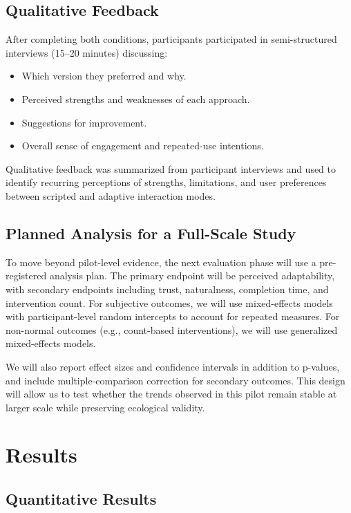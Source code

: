 \documentclass[pdflatex,sn-basic,Numbered,iicol,twocolumn]{sn-jnl}%
\begin{document}
\subsection{Qualitative Feedback}

After completing both conditions, participants participated in semi-structured interviews (15–20 minutes) discussing:
\begin{itemize}
\item Which version they preferred and why.
\item Perceived strengths and weaknesses of each approach.
\item Suggestions for improvement.
\item Overall sense of engagement and repeated-use intentions.
\end{itemize}

Qualitative feedback was summarized from participant interviews and used to identify recurring perceptions of strengths, limitations, and user preferences between scripted and adaptive interaction modes.

\subsection{Planned Analysis for a Full-Scale Study}

To move beyond pilot-level evidence, the next evaluation phase will use a pre-registered analysis plan. The primary endpoint will be perceived adaptability, with secondary endpoints including trust, naturalness, completion time, and intervention count. For subjective outcomes, we will use mixed-effects models with participant-level random intercepts to account for repeated measures. For non-normal outcomes (e.g., count-based interventions), we will use generalized mixed-effects models.

We will also report effect sizes and confidence intervals in addition to p-values, and include multiple-comparison correction for secondary outcomes. This design will allow us to test whether the trends observed in this pilot remain stable at larger scale while preserving ecological validity.
\section{Results}
\label{sec:results}

\subsection{Quantitative Results}
\end{document}
